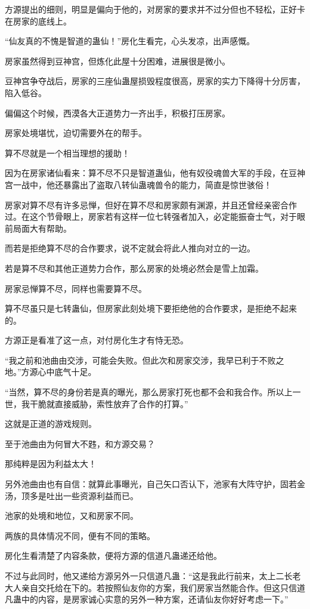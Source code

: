 \begin{this_body}
方源提出的细则，明显是偏向于他的，对房家的要求并不过分但也不轻松，正好卡在房家的底线上。

“仙友真的不愧是智道的蛊仙！”房化生看完，心头发凉，出声感慨。

房家虽然得到豆神宫，但炼化此屋十分困难，进展很是微小。

豆神宫争夺战后，房家的三座仙蛊屋损毁程度很高，房家的实力下降得十分厉害，陷入低谷。

偏偏这个时候，西漠各大正道势力一齐出手，积极打压房家。

房家处境堪忧，迫切需要外在的帮手。

算不尽就是一个相当理想的援助！

因为在房家诸仙看来：算不尽不只是智道蛊仙，他有奴役魂兽大军的手段，在豆神宫一战中，他还暴露出了盗取八转仙蛊魂兽令的能力，简直是惊世骇俗！

房家对算不尽有许多忌惮，但好在算不尽和房家颇有渊源，并且还曾经亲密合作过。在这个节骨眼上，房家若有这样一位七转强者加入，必定能振奋士气，对于眼前局面大有帮助。

而若是拒绝算不尽的合作要求，说不定就会将此人推向对立的一边。

若是算不尽和其他正道势力合作，那么房家的处境必然会是雪上加霜。

房家忌惮算不尽，同样也需要算不尽。

算不尽虽只是七转蛊仙，但房家此刻处境下要拒绝他的合作要求，是拒绝不起来的。

方源正是看准了这一点，对付房化生才有恃无恐。

“我之前和池曲由交涉，可能会失败。但此次和房家交涉，我早已利于不败之地。”方源心中底气十足。

“当然，算不尽的身份若是真的曝光，那么房家打死也都不会和我合作。所以上一世，我干脆就直接威胁，索性放弃了合作的打算。”

这就是正道的游戏规则。

至于池曲由为何冒大不韪，和方源交易？

那纯粹是因为利益太大！

另外池曲由也有自信：就算此事曝光，自己矢口否认下，池家有大阵守护，固若金汤，顶多是吐出一些资源利益而已。

池家的处境和地位，又和房家不同。

两族的具体情况不同，便有不同的策略。

房化生看清楚了内容条款，便将方源的信道凡蛊递还给他。

不过与此同时，他又递给方源另外一只信道凡蛊：“这是我此行前来，太上二长老大人亲自交托给在下的。若按照仙友你的方案，我们房家当然能合作。但这只信道凡蛊中的内容，是房家诚心实意的另外一种方案，还请仙友你好好考虑一下。”


\end{this_body}
